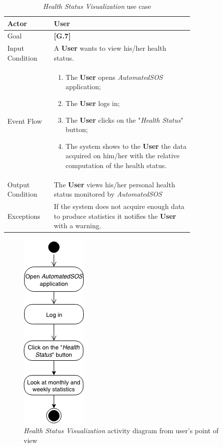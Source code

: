 \begin{center}
\begin{table}[H]
\begin{tabular}{ | l | p{0.75\linewidth} | }
  \hline
    Actor & \textbf{User} \\ \hline
    Goal & \textbf{[G.7]} \\ \hline
    Input Condition & A \textbf{User} wants to view his/her health status.\\ \hline
    Event Flow & \begin{minipage}[t]{0.7\textwidth}
      \begin{enumerate}
        \item The \textbf{User} opens \textit{AutomatedSOS} application;
        \item The \textbf{User} logs in;
        \item The \textbf{User} clicks on the "\textit{Health Status}" button;
        \item The system shows to the \textbf{User} the data acquired on him/her with the relative computation of the health status.
      \end{enumerate}
    \smallskip
  \end{minipage} \\ \hline
  Output Condition & The \textbf{User} views his/her personal health status monitored by \textit{AutomatedSOS}\\ \hline
  Exceptions & If the system does not acquire enough data to produce statistics it notifies the \textbf{User} with a warning.  \\ \hline
\end{tabular}
\caption{\textit{Health Status Visualization} use case}
\label{table:healthStatus}
\end{table}
\end{center}

\begin{figure}[H]
\begin{center}
  \includegraphics{img/activity/HealthStatus.png}
  \hspace{0.05\linewidth}
  \centering
  \caption{\textit{Health Status Visualization} activity diagram from user's point of view}
  \label{img:healthStatusActivityDiagram}
\end{center}
\end{figure}

